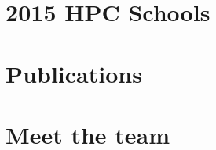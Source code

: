 \documentclass{article}
\begin{document}





\section{\faCalendar\ 2015 HPC Schools}



\section{\faFileAlt\ Publications}




\clearpage
\section{\faUser\ Meet the team}

\end{document}
